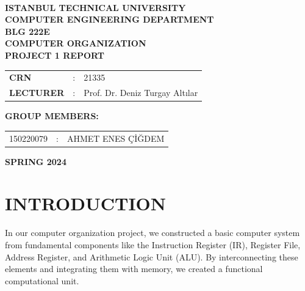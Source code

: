 \documentclass[pdftex,12pt,a4paper]{article}
\begin{document}
\begin{titlepage}
\begin{center}
\textbf{}\\
\textbf{\Large{ISTANBUL TECHNICAL UNIVERSITY}}\\
\vspace{0.5cm}
\textbf{\Large{COMPUTER ENGINEERING DEPARTMENT}}\\
\vspace{4cm}
\textbf{\Large{BLG 222E\\ COMPUTER ORGANIZATION\\ PROJECT 1 REPORT}}\\
\vspace{4cm}
\begin{table}[ht]
\centering
\Large{
\begin{tabular}{lcl}
\textbf{CRN}  & : & 21335 \\
\textbf{LECTURER}  & : & Prof. Dr. Deniz Turgay Altılar \\
\end{tabular}}
\end{table}
\vspace{1cm}
\textbf{\Large{GROUP MEMBERS:}}\\
\begin{table}[ht]
\centering
\Large{
\begin{tabular}{rcl}
150220079  & : & AHMET ENES ÇİĞDEM \\
\end{tabular}}
\end{table}
\vspace{2.8cm}
\textbf{\Large{SPRING 2024}}

\end{center}

\end{titlepage}

\thispagestyle{empty}
\setcounter{tocdepth}{4}
\tableofcontents
\clearpage

\setcounter{page}{1}

\section{INTRODUCTION}

In our computer organization project, we constructed a basic computer system from fundamental components like the Instruction Register (IR), Register File, Address Register, and Arithmetic Logic Unit (ALU). By interconnecting these elements and integrating them with memory, we created a functional computational unit.
\end{document}
